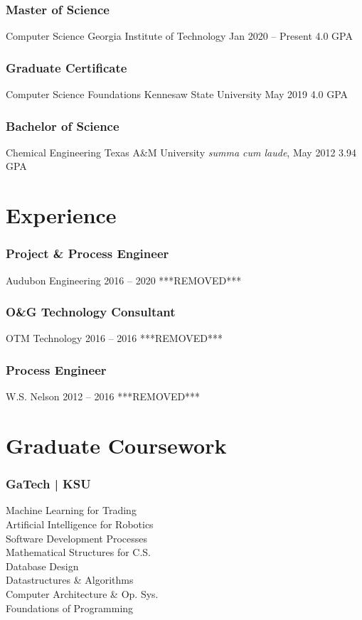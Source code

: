   \subsubsection{Master of Science} 
  \school%
    {Computer Science}%
    {Georgia Institute of Technology}%
    {Jan 2020 -- Present}%
    {4.0 GPA}
  \subsubsection{Graduate Certificate}
  \school%
    {Computer Science Foundations}%
    {Kennesaw State University}%
    {May 2019}%
    {4.0 GPA}
  \subsubsection{Bachelor of Science}
  \school%
    {Chemical Engineering}%
    {Texas A\&M University}%
    {\textit{summa cum laude}, May 2012}%
    {3.94 GPA}
\section{Experience}
  \subsubsection{Project \& Process Engineer}
  \position%
    {Audubon Engineering}%
    {2016 -- 2020}%
    {***REMOVED***}
  \subsubsection{O\&G Technology Consultant}
  \position%
    {OTM Technology}%
    {2016 -- 2016}%
    {***REMOVED***}
  \subsubsection{Process Engineer}
  \position%
    {W.S. Nelson}%
    {2012 -- 2016}%
    {***REMOVED***}
\section{Graduate Coursework}
  \subsubsection{GaTech | KSU}
      {\vspace{0.1em}}
      Machine Learning for Trading\\
      Artificial Intelligence for Robotics\\
      Software Development Processes\\
      Mathematical Structures for C.S.\\
      Database Design\\
      Datastructures \& Algorithms\\
      Computer Architecture \& Op. Sys.\\
      Foundations of Programming\\
